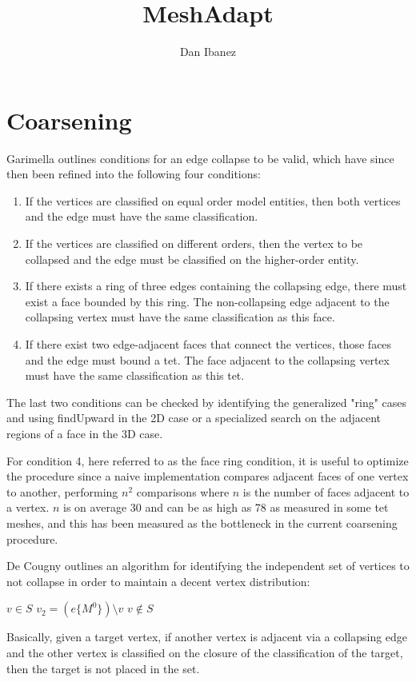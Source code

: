 \documentclass{article}
\title{MeshAdapt}
\author{Dan Ibanez}
\begin{document}
\maketitle

\section{Coarsening}

Garimella outlines conditions for an
edge collapse to be valid, which have since then been refined
into the following four conditions:

\begin{enumerate}
\item If the vertices are classified on equal order model entities,
then both vertices and the edge must have the same classification.
\item If the vertices are classified on different orders, then
the vertex to be collapsed and the edge must be classified on
the higher-order entity.
\item If there exists a ring of three edges containing the
collapsing edge, there must exist a face bounded by this ring.
The non-collapsing edge adjacent to the collapsing vertex
must have the same classification as this face.
\item If there exist two edge-adjacent faces that connect
the vertices, those faces and the edge must bound a tet.
The face adjacent to the collapsing vertex must
have the same classification as this tet.
\end{enumerate}

The last two conditions can be checked by identifying the generalized
"ring" cases and using findUpward in the 2D case or a specialized
search on the adjacent regions of a face in the 3D case.

For condition 4, here referred to as the face ring condition,
it is useful to optimize the procedure since a naive implementation
compares adjacent faces of one vertex to another, performing $n^2$
comparisons where $n$ is the number of faces adjacent to a vertex.
$n$ is on average 30 and can be as high as 78 as measured in some tet
meshes, and this has been measured as the bottleneck in the current
coarsening procedure.

De Cougny outlines an algorithm for identifying the independent set
of vertices to not collapse in order to maintain a decent vertex
distribution:
\begin{algorithmic}
\State $v \in S$
\State $v_2 = (e\{M^0\})\setminus v$
\State $v\not\in S$
\EndIf
\EndIf
\EndIf
\EndFor
\EndFor
\EndFor
\end{algorithmic}
Basically, given a target vertex, if another vertex is adjacent via
a collapsing edge and the other vertex is classified on the closure
of the classification of the target, then the target is not placed
in the set.
\end{document}
